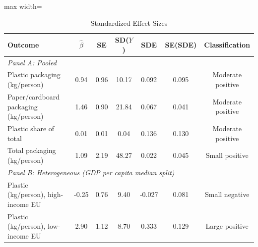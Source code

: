 \begin{table}[t]
\centering
\caption{Standardized Effect Sizes}
\label{tab:sde}
\begin{adjustbox}{max width=\textwidth}
\begin{tabular}{lcccccc}
\toprule
  Outcome & $\hat{\beta}$ & SE & SD($Y$) & SDE & SE(SDE) & Classification \\
\midrule
\multicolumn{7}{l}{\textit{Panel A: Pooled}} \\[3pt]
  Plastic packaging (kg/person) & 0.94 & 0.96 & 10.17 & 0.092 & 0.095 & Moderate positive \\
  Paper/cardboard packaging (kg/person) & 1.46 & 0.90 & 21.84 & 0.067 & 0.041 & Moderate positive \\
  Plastic share of total & 0.01 & 0.01 & 0.04 & 0.136 & 0.130 & Moderate positive \\
  Total packaging (kg/person) & 1.09 & 2.19 & 48.27 & 0.022 & 0.045 & Small positive \\
\midrule
\multicolumn{7}{l}{\textit{Panel B: Heterogeneous (GDP per capita median split)}} \\[3pt]
  Plastic (kg/person), high-income EU & -0.25 & 0.76 & 9.40 & -0.027 & 0.081 & Small negative \\
  Plastic (kg/person), low-income EU & 2.90 & 1.12 & 8.70 & 0.333 & 0.129 & Large positive \\
\bottomrule
\end{tabular}
\end{adjustbox}
\begin{tablenotes}[flushleft]
\small

\end{tablenotes}
\end{table}

